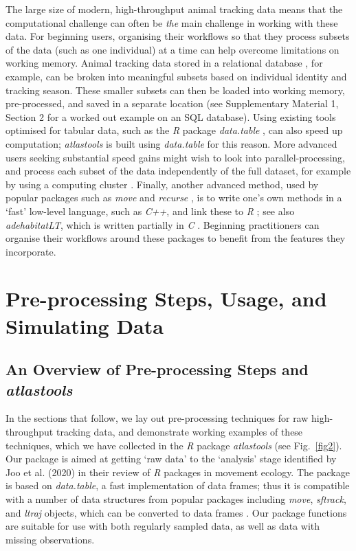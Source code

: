 \begin{refsection}
    The large size of modern, high-throughput animal tracking data means that the computational challenge can often be \textit{the} main challenge in working with these data.
    For beginning users, organising their workflows so that they process subsets of the data (such as one individual) at a time can help overcome limitations on working memory.
    Animal tracking data stored in a relational database \cite[e.g. SQL databases][]{codd1970}, for example, can be broken into meaningful subsets based on individual identity and tracking season.
    These smaller subsets can then be loaded into working memory, pre-processed, and saved in a separate location (see Supplementary Material 1, Section 2 for a worked out example on an SQL database).
    Using existing tools optimised for tabular data, such as the \textit{R} package \textit{data.table} \cite{dowle2020}, can also speed up computation; \textit{atlastools} is built using \textit{data.table} for this reason.
    More advanced users seeking substantial speed gains might wish to look into parallel-processing, and process each subset of the data independently of the full dataset, for example by using a computing cluster \cite[see also][for an alternative]{zjdai2021}.
    Finally, another advanced method, used by popular packages such as \textit{move} \cite{kranstauber2011} and \textit{recurse} \cite{bracis2018}, is to write one's own methods in a `fast' low-level language, such as \textit{C++}, and link these to \textit{R} \cite[][]{eddelbuettel2013}; see also \textit{adehabitatLT}, which is written partially in \textit{C} \cite{calenge2006}.
    Beginning practitioners can organise their workflows around these packages to benefit from the features they incorporate.

    \section*{Pre-processing Steps, Usage, and Simulating Data}

    \subsection*{An Overview of Pre-processing Steps and \textit{atlastools}}

    In the sections that follow, we lay out pre-processing techniques for raw high-throughput tracking data, and demonstrate working examples of these techniques, which we have collected in the \textit{R} package \textit{atlastools} (see Fig.~\ref{fig2}).
    Our package is aimed at getting `raw data' to the `analysis' stage identified by Joo et al. (2020) in their review of \textit{R} packages in movement ecology.
    The package is based on \textit{data.table}, a fast implementation of data frames; thus it is compatible with a number of data structures from popular packages including \textit{move}, \textit{sftrack}, and \textit{ltraj} objects, which can be converted to data frames \citep[][]{kranstauber2011,boone2020,calenge2009}.
    Our package functions are suitable for use with both regularly sampled data, as well as data with missing observations.


\end{refsection}
